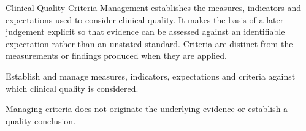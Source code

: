 Clinical Quality Criteria Management establishes the measures, indicators and expectations used to consider clinical quality. It makes the basis of a later judgement explicit so that evidence can be assessed against an identifiable expectation rather than an unstated standard. Criteria are distinct from the measurements or findings produced when they are applied.



Establish and manage measures, indicators, expectations and criteria against which clinical quality is considered.



Managing criteria does not originate the underlying evidence or establish a quality conclusion.


